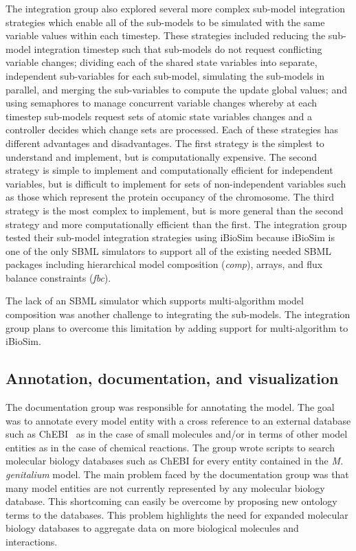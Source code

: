 \documentclass[journal,transmag]{IEEEtran}
\begin{document}
The integration group also explored several more complex sub-model integration strategies which enable all of the sub-models to be simulated with the same variable values within each timestep. These strategies included reducing the sub-model integration timestep such that sub-models do not request conflicting variable changes; dividing each of the shared state variables into separate, independent sub-variables for each sub-model, simulating the sub-models in parallel, and merging the sub-variables to compute the update global values; and using semaphores to manage concurrent variable changes whereby at each timestep sub-models request sets of atomic state variables changes and a controller decides which change sets are processed. Each of these strategies has different advantages and disadvantages. The first strategy is the simplest to understand and implement, but is computationally expensive. The second strategy is simple to implement and computationally efficient for independent variables, but is difficult to implement for sets of non-independent variables such as those which represent the protein occupancy of the chromosome. The third strategy is the most complex to implement, but is more general than the second strategy and more computationally efficient than the first. The integration group tested their sub-model integration strategies using iBioSim because iBioSim is one of the only SBML simulators to support all of the existing needed SBML packages including hierarchical model composition (\emph{comp}), arrays, and flux balance constraints (\emph{fbc}).

The lack of an SBML simulator which supports multi-algorithm model composition was another challenge to integrating the sub-models. The integration group plans to overcome this limitation by adding support for multi-algorithm to iBioSim.

\subsection{Annotation, documentation, and visualization}
The documentation group was responsible for annotating the model.
The goal was to annotate every model entity with a cross reference to an external database such as ChEBI~\cite{Hastings2013} as in the case of small molecules and/or in terms of other model entities as in the case of chemical reactions.
The group wrote scripts to search molecular biology databases such as ChEBI for every entity contained in the \textit{M. genitalium} model.
The main problem faced by the documentation group was that many model entities are not currently represented by any molecular biology database.
This shortcoming can easily be overcome by proposing new ontology terms to the databases.
This problem highlights the need for expanded molecular biology databases to aggregate data on more biological molecules and interactions. 
\end{document}
